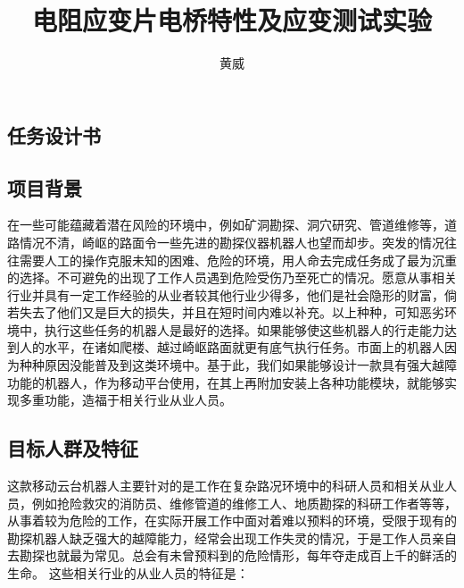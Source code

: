 \documentclass[12pt]{article}
\begin{document}
\begin{CJK}{UTF8}{gbsn}        %
 \pagestyle{fancy}
 \lhead{}
 \chead{}
 \rfoot{\thepage}
 \renewcommand{\headrulewidth}{0.4pt}
 \renewcommand{\footrulewidth}{0.4pt}
 
\author{黄威}
\title{电阻应变片电桥特性及应变测试实验}

\renewcommand{\contentsname}{目录} %
\tableofcontents
\newpage


\section{任务设计书}


\subsection{项目背景}

在一些可能蕴藏着潜在风险的环境中，例如矿洞勘探、洞穴研究、管道维修等，道路情况不清，崎岖的路面令一些先进的勘探仪器机器人也望而却步。突发的情况往往需要人工的操作克服未知的困难、危险的环境，用人命去完成任务成了最为沉重的选择。不可避免的出现了工作人员遇到危险受伤乃至死亡的情况。愿意从事相关行业并具有一定工作经验的从业者较其他行业少得多，他们是社会隐形的财富，倘若失去了他们又是巨大的损失，并且在短时间内难以补充。以上种种，可知恶劣环境中，执行这些任务的机器人是最好的选择。如果能够使这些机器人的行走能力达到人的水平，在诸如爬楼、越过崎岖路面就更有底气执行任务。市面上的机器人因为种种原因没能普及到这类环境中。基于此，我们如果能够设计一款具有强大越障功能的机器人，作为移动平台使用，在其上再附加安装上各种功能模块，就能够实现多重功能，造福于相关行业从业人员。

\subsection{目标人群及特征}
\label{sec:fastguide}
这款移动云台机器人主要针对的是工作在复杂路况环境中的科研人员和相关从业人员，例如抢险救灾的消防员、维修管道的维修工人、地质勘探的科研工作者等等，从事着较为危险的工作，在实际开展工作中面对着难以预料的环境，受限于现有的勘探机器人缺乏强大的越障能力，经常会出现工作失灵的情况，于是工作人员亲自去勘探也就最为常见。总会有未曾预料到的危险情形，每年夺走成百上千的鲜活的生命。
这些相关行业的从业人员的特征是：


\end{CJK}
\end{document}
